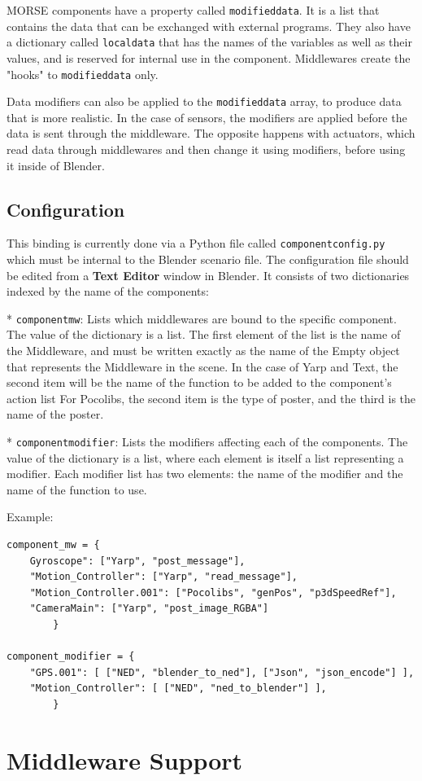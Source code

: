 \documentclass[twoside,a4paper,10pt]{report}
\newcommand{\dokutitlelevelone}[1]{\chapter{#1}}
\newcommand{\dokutitleleveltwo}[1]{\section{#1}}
\newcommand{\dokubold}[1]{\textbf{#1}}
\newcommand{\dokumonospace}[1]{\texttt{#1}}
\begin{document}
MORSE components have a property called \dokumonospace{modified{\textunderscore}data}. It is a list that contains the data that can be exchanged with external programs. They also have a dictionary called \dokumonospace{local{\textunderscore}data} that has the names of the variables as well as their values, and is reserved for internal use in the component. Middlewares create the "hooks" to \dokumonospace{modified{\textunderscore}data} only.

Data modifiers can also be applied to the \dokumonospace{modified{\textunderscore}data} array, to produce data that is more realistic. In the case of sensors, the modifiers are applied before the data is sent through the middleware. The opposite happens with actuators, which read data through middlewares and then change it using modifiers, before using it inside of Blender.


\dokutitleleveltwo{Configuration}
\label{ccd1066343c95877b75b79d47c36bebe}%

This binding is currently done via a Python file called \dokumonospace{component{\textunderscore}config.py}
which must be internal to the Blender scenario file. The configuration file should be edited from a \dokubold{Text Editor} window in Blender.
It consists of two dictionaries indexed by the name of the components:

* \dokumonospace{component{\textunderscore}mw}: Lists which middlewares are bound to the specific component. The value of the dictionary is a list. The first element of the list is the name of the Middleware, and must be written exactly as the name of the Empty object that represents the Middleware in the scene.
In the case of Yarp and Text, the second item will be the name of the function to be added to the component's action list For Pocolibs, the second item is the type of poster, and the third is the name of the poster.

* \dokumonospace{component{\textunderscore}modifier}: Lists the modifiers affecting each of the components. The value of the dictionary is a list, where each element is itself a list representing a modifier. Each modifier list has two elements: the name of the modifier and the name of the function to use.

Example:


\lstset{language=python}
\begin{lstlisting}
component_mw = {
	Gyroscope": ["Yarp", "post_message"],
	"Motion_Controller": ["Yarp", "read_message"],
	"Motion_Controller.001": ["Pocolibs", "genPos", "p3dSpeedRef"],
	"CameraMain": ["Yarp", "post_image_RGBA"]
		}

component_modifier = {
	"GPS.001": [ ["NED", "blender_to_ned"], ["Json", "json_encode"] ],
	"Motion_Controller": [ ["NED", "ned_to_blender"] ],
		}

\end{lstlisting}
\dokutitlelevelone{Middleware Support}
\label{4303941a1597ae94654bd96854480742}%
\label{9a05db9c4b60b0527010fd997682f523}%
\end{document}
